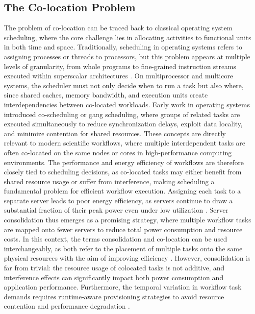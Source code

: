 \subsection{The Co-location Problem}
\label{sec:background_colocation}
The problem of co-location can be traced back to classical operating system scheduling, where the core challenge lies in allocating activities to functional units in both time and space. Traditionally, scheduling in operating systems refers to assigning processes or threads to processors, but this problem appears at multiple levels of granularity, from whole programs to fine-grained instruction streams executed within superscalar architectures \cite{5702048}. On multiprocessor and multicore systems, the scheduler must not only decide when to run a task but also where, since shared caches, memory bandwidth, and execution units create interdependencies between co-located workloads. Early work in operating systems introduced co-scheduling or gang scheduling, where groups of related tasks are executed simultaneously to reduce synchronization delays, exploit data locality, and minimize contention for shared resources. These concepts are directly relevant to modern scientific workflows, where multiple interdependent tasks are often co-located on the same nodes or cores in high-performance computing environments. The performance and energy efficiency of workflows are therefore closely tied to scheduling decisions, as co-located tasks may either benefit from shared resource usage or suffer from interference, making scheduling a fundamental problem for efficient workflow execution.
Assigning each task to a separate server leads to poor energy efficiency, as servers continue to draw a substantial fraction of their peak power even under low utilization \cite{6193474} \cite{Kuity_2023}. Server consolidation thus emerges as a promising strategy, where multiple workflow tasks are mapped onto fewer servers to reduce total power consumption and resource costs. In this context, the terms consolidation and co-location can be used interchangeably, as both refer to the placement of multiple tasks onto the same physical resources with the aim of improving efficiency \cite{5644899}. However, consolidation is far from trivial: the resource usage of colocated tasks is not additive, and interference effects can significantly impact both power consumption and application performance. Furthermore, the temporal variation in workflow task demands requires runtime-aware provisioning strategies to avoid resource contention and performance degradation \cite{5644899}.

